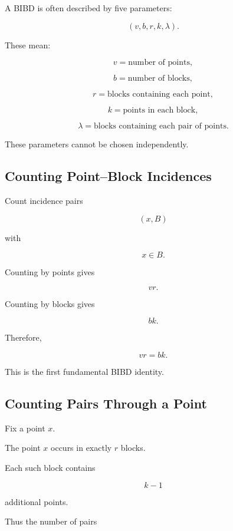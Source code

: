 A BIBD is often described by five parameters:

\[
\boxed{
(v,b,r,k,\lambda).
}
\]

These mean:

\[
v
=
\text{number of points},
\]

\[
b
=
\text{number of blocks},
\]

\[
r
=
\text{blocks containing each point},
\]

\[
k
=
\text{points in each block},
\]

\[
\lambda
=
\text{blocks containing each pair of points}.
\]

These parameters cannot be chosen independently.

\subsection{Counting Point--Block Incidences}
\label{subsec:counting-point-block-incidences}

Count incidence pairs

\[
(x,B)
\]

with

\[
x\in B.
\]

Counting by points gives

\[
vr.
\]

Counting by blocks gives

\[
bk.
\]

Therefore,

\[
\boxed{
vr=bk.
}
\]

This is the first fundamental BIBD identity.

\subsection{Counting Pairs Through a Point}
\label{subsec:counting-pairs-through-point}

Fix a point \(x\).

The point \(x\) occurs in exactly \(r\) blocks.

Each such block contains

\[
k-1
\]

additional points.

Thus the number of pairs

